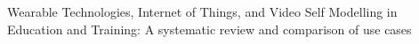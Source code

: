 Wearable Technologies, Internet of Things, and Video Self Modelling in Education and Training: A systematic review and comparison of use cases